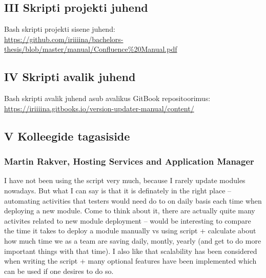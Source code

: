 \documentclass[12pt]{report}
\begin{document}
  \subsection*{III Skripti projekti juhend}
  \label{documentation}
  
  Bash skripti projekti sisene juhend:\\
  \url{https://github.com/iriiiina/bachelors-thesis/blob/master/manual/Confluence%20Manual.pdf}
  
  \subsection*{IV Skripti avalik juhend}
  \label{public-documentation}
  
  Bash skripti avalik juhend asub avalikus GitBook repositoorimus:\\
  \url{https://iriiiina.gitbooks.io/version-updater-manual/content/}
  
  \subsection*{V Kolleegide tagasiside}
  \label{feedback}
  
  \subsubsection{Martin Rakver, Hosting Services and Application Manager}
  
  \begin{displayquote}
  I have not been using the script very much, because I rarely update modules nowadays. But what I can say is that it is definately in the right place – automating activities that testers would need do to on daily basis each time when deploying a new module. Come to think about it, there are actually quite many activites related to new module deployment – would be interesting to compare the time it takes to deploy a module manually vs using script + calculate about how much time we as a team are saving daily, montly, yearly (and get to do more important things with that time).
I also like that scalability has been considered when writing the script + many optional features have been implemented which can be used if one desires to do so.
  \end{displayquote}
\end{document}
